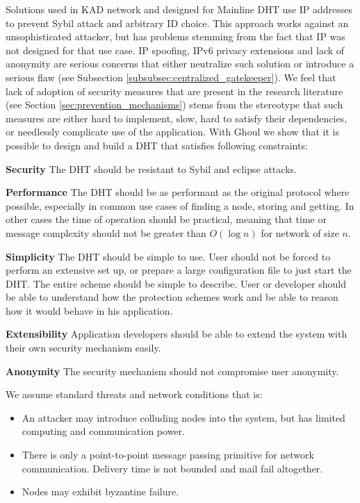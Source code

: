 Solutions used in KAD network and designed for Mainline DHT use IP addresses to
prevent Sybil attack and arbitrary ID choice. This approach works against
an unsophisticated attacker, but has problems stemming from the fact that IP was
not designed for that use case.
IP spoofing, IPv6 privacy extensions and lack of anonymity are serious concerns
that either neutralize such solution or introduce a serious flaw
(see Subsection \ref{subsubsec:centralized_gatekeeper}).
We feel that lack of adoption of security measures that are
present in the research literature (see Section \ref{sec:prevention_mechanisms})
stems from the stereotype that such measures are either hard to implement, slow,
hard to satisfy their dependencies, or needlessly complicate use of the
application. With Ghoul we show that it is possible to design and build a DHT
that satisfies following constraints:

\begin{description}
  \item{\textbf{Security}} The DHT should be resistant to Sybil and
    eclipse attacks.
  \item{\textbf{Performance}} The DHT should be as performant as the original
    protocol where possible, especially in common use cases of finding a node,
    storing and getting. In other cases the time of operation should be
    practical, meaning that time or message complexity should not be greater
    than $O(\log n)$ for network of size $n$.
  \item{\textbf{Simplicity}} The DHT should be simple to use. User should not be
    forced to perform an extensive set up, or prepare a large configuration file
    to just start the DHT.  The entire scheme should be simple to describe. User
    or developer should be able to understand how the protection schemes work
    and be able to reason how it would behave in his application.
  \item{\textbf{Extensibility}} Application developers should be able to extend
    the system with their own security mechanism easily.
  \item{\textbf{Anonymity}} The security mechanism should not compromise user
    anonymity.
\end{description}

We assume standard threats and network conditions that is:

\begin{itemize}
  \item An attacker may introduce colluding nodes into the system, but has
    limited computing and communication power.
  \item There is only a point-to-point message passing primitive for network
    communication. Delivery time is not bounded and mail fail altogether.
  \item Nodes may exhibit byzantine failure.
\end{itemize}

